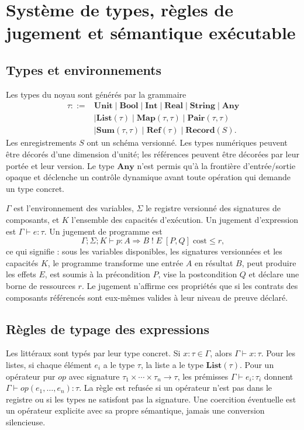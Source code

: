 \documentclass[11pt,a4paper]{article}
\theoremstyle{definition}
\theoremstyle{plain}
\theoremstyle{remark}
\begin{document}
\section{Système de types, règles de jugement et sémantique exécutable}
\subsection{Types et environnements}
Les types du noyau sont générés par la grammaire
\begin{align*}
\tau ::= {}& \mathbf{Unit}\mid\mathbf{Bool}\mid\mathbf{Int}\mid\mathbf{Real}\mid\mathbf{String}\mid\mathbf{Any}\\
&\mid \mathbf{List}(\tau)\mid \mathbf{Map}(\tau,\tau)\mid \mathbf{Pair}(\tau,\tau)\\
&\mid \mathbf{Sum}(\tau,\tau)\mid \mathbf{Ref}(\tau)\mid \mathbf{Record}(S).
\end{align*}
Les enregistrements $S$ ont un schéma versionné. Les types numériques peuvent être décorés d'une dimension d'unité; les références peuvent être décorées par leur portée et leur version. Le type $\mathbf{Any}$ n'est permis qu'à la frontière d'entrée/sortie opaque et déclenche un contrôle dynamique avant toute opération qui demande un type concret.

$\Gamma$ est l'environnement des variables, $\Sigma$ le registre versionné des signatures de composants, et $K$ l'ensemble des capacités d'exécution. Un jugement d'expression est $\Gamma\vdash e:\tau$. Un jugement de programme est
\[
\Gamma;\Sigma;K\vdash p: A\Rightarrow B\;!\;E\;[P,Q]\;\text{cost}\leq r,
\]
ce qui signifie : sous les variables disponibles, les signatures versionnées et les capacités $K$, le programme transforme une entrée $A$ en résultat $B$, peut produire les effets $E$, est soumis à la précondition $P$, vise la postcondition $Q$ et déclare une borne de ressources $r$. Le jugement n'affirme ces propriétés que si les contrats des composants référencés sont eux-mêmes valides à leur niveau de preuve déclaré.

\subsection{Règles de typage des expressions}
Les littéraux sont typés par leur type concret. Si $x:\tau\in\Gamma$, alors $\Gamma\vdash x:\tau$. Pour les listes, si chaque élément $e_i$ a le type $\tau$, la liste a le type $\mathbf{List}(\tau)$. Pour un opérateur pur $op$ avec signature $\tau_1\times\cdots\times\tau_n\to\tau$, les prémisses $\Gamma\vdash e_i:\tau_i$ donnent $\Gamma\vdash op(e_1,\ldots,e_n):\tau$. La règle est refusée si un opérateur n'est pas dans le registre ou si les types ne satisfont pas la signature. Une coercition éventuelle est un opérateur explicite avec sa propre sémantique, jamais une conversion silencieuse.
\end{document}
